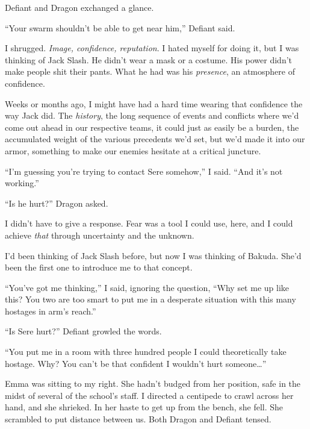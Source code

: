 Defiant and Dragon exchanged a glance.



``Your swarm shouldn't be able to get near him,'' Defiant said.



I shrugged.  \emph{Image, confidence, reputation}.  I hated myself for doing it, but I was thinking of Jack Slash.  He didn't wear a mask or a costume.  His power didn't make people shit their pants.  What he had was his \emph{presence}, an atmosphere of confidence.



Weeks or months ago, I might have had a hard time wearing that confidence the way Jack did.  The \emph{history}, the long sequence of events and conflicts where we'd come out ahead in our respective teams, it could just as easily be a burden, the accumulated weight of the various precedents we'd set, but we'd made it into our armor, something to make our enemies hesitate at a critical juncture.



``I'm guessing you're trying to contact Sere somehow,'' I said.  ``And it's not working.''



``Is he hurt?'' Dragon asked.



I didn't have to give a response.  Fear was a tool I could use, here, and I could achieve \emph{that} through uncertainty and the unknown.



I'd been thinking of Jack Slash before, but now I was thinking of Bakuda.  She'd been the first one to introduce me to that concept.



``You've got me thinking,'' I said, ignoring the question, ``Why set me up like this?  You two are too smart to put me in a desperate situation with this many hostages in arm's reach.''



``Is Sere hurt?'' Defiant growled the words.



``You put me in a room with three hundred people I could theoretically take hostage.  Why?  You can't be that confident I wouldn't hurt someone\ldots''



Emma was sitting to my right.  She hadn't budged from her position, safe in the midst of several of the school's staff.  I directed a centipede to crawl across her hand, and she shrieked.  In her haste to get up from the bench, she fell.  She scrambled to put distance between us.  Both Dragon and Defiant tensed.



